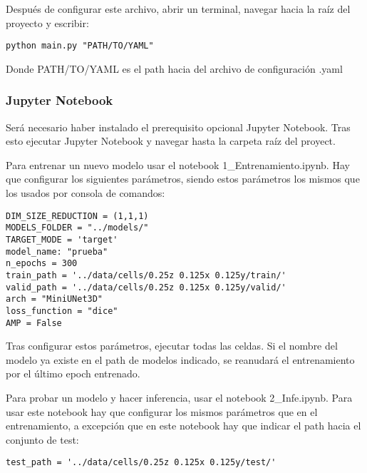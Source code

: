 Después de configurar este archivo, abrir un terminal, navegar hacia la raíz del proyecto y escribir:

\begin{verbatim}
python main.py "PATH/TO/YAML"
\end{verbatim}

Donde PATH/TO/YAML es el path hacia del archivo de configuración .yaml

\subsubsection{Jupyter Notebook}

Será necesario haber instalado el prerequisito opcional Jupyter Notebook. Tras esto ejecutar Jupyter Notebook y navegar hasta la carpeta raíz del proyect.

Para entrenar un nuevo modelo usar el notebook 1\_Entrenamiento.ipynb. Hay que configurar los siguientes parámetros, siendo estos parámetros los mismos que los usados por consola de comandos:

\begin{verbatim}
DIM_SIZE_REDUCTION = (1,1,1)
MODELS_FOLDER = "../models/"
TARGET_MODE = 'target'
model_name: "prueba"
n_epochs = 300
train_path = '../data/cells/0.25z 0.125x 0.125y/train/'
valid_path = '../data/cells/0.25z 0.125x 0.125y/valid/'
arch = "MiniUNet3D"
loss_function = "dice"
AMP = False
\end{verbatim}

Tras configurar estos parámetros, ejecutar todas las celdas. Si el nombre del modelo ya existe en el path de modelos indicado, se reanudará el entrenamiento por el último epoch entrenado.

Para probar un modelo y hacer inferencia, usar el notebook 2\_Infe.ipynb. Para usar este notebook hay que configurar los mismos parámetros que en el entrenamiento, a excepción que en este notebook hay que indicar el path hacia el conjunto de test:

\verb|test_path = '../data/cells/0.25z 0.125x 0.125y/test/'|